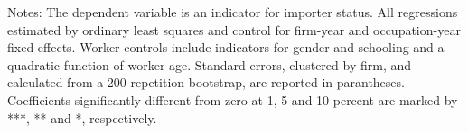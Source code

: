 \begin{tablenotes}
\item \footnotesize Notes: The dependent variable is an indicator for importer status. All regressions estimated by ordinary least squares and control for firm-year and occupation-year fixed effects. Worker controls include indicators for gender and schooling and a quadratic function of worker age. Standard errors, clustered by firm, and calculated from a 200 repetition bootstrap, are reported in parantheses. Coefficients significantly different from zero at 1, 5 and 10 percent are marked by ***, ** and *, respectively.

\end{tablenotes} 